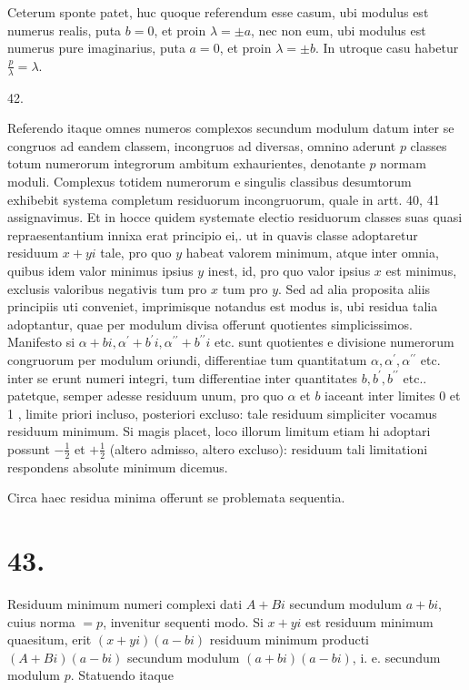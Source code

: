 \documentclass[10pt]{article}
\begin{document}
Ceterum sponte patet, huc quoque referendum esse casum, ubi modulus est numerus realis, puta \(b=0\), et proin \(\lambda= \pm a\), nec non eum, ubi modulus est numerus pure imaginarius, puta \(a=0\), et proin \(\lambda= \pm b\). In utroque casu habetur \(\frac{p}{\lambda}=\lambda\).

42.

Referendo itaque omnes numeros complexos secundum modulum datum inter se congruos ad eandem classem, incongruos ad diversas, omnino aderunt \(p\) classes totum numerorum integrorum ambitum exhaurientes, denotante \(p\) normam moduli. Complexus totidem numerorum e singulis classibus desumtorum exhibebit systema completum residuorum incongruorum, quale in artt. 40, 41 assignavimus. Et in hocce quidem systemate electio residuorum classes suas quasi repraesentantium innixa erat principio ei,. ut in quavis classe adoptaretur residuum \(x+y i\) tale, pro quo \(y\) habeat valorem minimum, atque inter omnia, quibus idem valor minimus ipsius \(y\) inest, id, pro quo valor ipsius \(x\) est minimus, exclusis valoribus negativis tum pro \(x\) tum pro \(y\). Sed ad alia proposita aliis principiis uti conveniet, imprimisque notandus est modus is, ubi residua talia adoptantur, quae per modulum divisa offerunt quotientes simplicissimos. Manifesto si \(\alpha+b i, \alpha^{\prime}+b^{\prime} i, \alpha^{\prime \prime}+b^{\prime \prime} i\) etc. sunt quotientes e divisione numerorum congruorum per modulum oriundi, differentiae tum quantitatum \(\alpha, \alpha^{\prime}, \alpha^{\prime \prime}\) etc. inter se erunt numeri integri, tum differentiae inter quantitates \(b, b^{\prime}, b^{\prime \prime}\) etc.. patetque, semper adesse residuum unum, pro quo \(\alpha\) et \(b\) iaceant inter limites 0 et 1 , limite priori incluso, posteriori excluso: tale residuum simpliciter vocamus residuum minimum. Si magis placet, loco illorum limitum etiam hi adoptari possunt \(-\frac{1}{2}\) et \(+\frac{1}{2}\) (altero admisso, altero excluso): residuum tali limitationi respondens absolute minimum dicemus.

Circa haec residua minima offerunt se problemata sequentia.

\section*{43.}
Residuum minimum numeri complexi dati \(A+B i\) secundum modulum \(a+b i\), cuius norma \(=p\), invenitur sequenti modo. Si \(x+y i\) est residuum minimum quaesitum, erit \((x+y i)(a-b i)\) residuum minimum producti \((A+B i)(a-b i)\) secundum modulum \((a+b i)(a-b i)\), i. e. secundum modulum \(p\). Statuendo itaque
\end{document}
